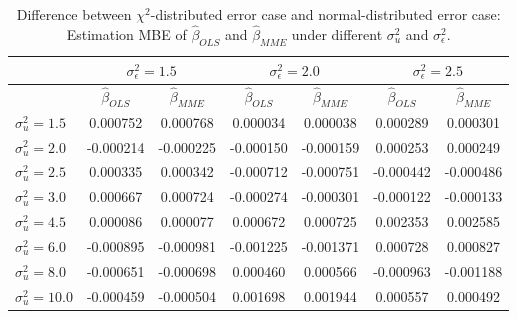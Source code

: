 \documentclass{article}
\begin{document}
\begin{table}[ht]
    \centering
    \caption{Difference between $\chi^2$-distributed error case and normal-distributed error case: Estimation MBE of $\hat{\beta}_{OLS}$ and $\hat{\beta}_{MME}$ under different $\sigma^2_u$ and $\sigma^2_\epsilon$.}
    \label{Tab:MBE_diff_chi_normal}
    \begin{tabular}[t]{lcccccc}
        \hline
        &\multicolumn{2}{c}{$\sigma^2_\epsilon=1.5$}&\multicolumn{2}{c}{$\sigma^2_\epsilon=2.0$}&\multicolumn{2}{c}{$\sigma^2_\epsilon=2.5$}\\
        \hline
        &$\hat{\beta}_{OLS}$&$\hat{\beta}_{MME}$&$\hat{\beta}_{OLS}$&$\hat{\beta}_{MME}$&$\hat{\beta}_{OLS}$&$\hat{\beta}_{MME}$\\
        \hline
        $\sigma^2_u = 1.5$&0.000752&0.000768&0.000034&0.000038&0.000289&0.000301\\
        $\sigma^2_u = 2.0$&-0.000214&-0.000225&-0.000150&-0.000159&0.000253&0.000249\\
        $\sigma^2_u = 2.5$&0.000335&0.000342&-0.000712&-0.000751&-0.000442&-0.000486\\
        $\sigma^2_u = 3.0$&0.000667&0.000724&-0.000274&-0.000301&-0.000122&-0.000133\\
        $\sigma^2_u = 4.5$&0.000086&0.000077&0.000672&0.000725&0.002353&0.002585\\
        $\sigma^2_u = 6.0$&-0.000895&-0.000981&-0.001225&-0.001371&0.000728&0.000827\\
        $\sigma^2_u = 8.0$&-0.000651&-0.000698&0.000460&0.000566&-0.000963&-0.001188\\
        $\sigma^2_u = 10.0$&-0.000459&-0.000504&0.001698&0.001944&0.000557&0.000492\\
        \hline
    \end{tabular}
\end{table}
\end{document}
